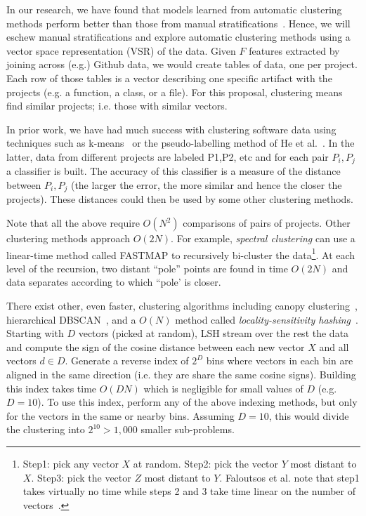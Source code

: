 In our research, we have found that models learned from automatic clustering methods
perform better than those from manual stratifications~\cite{me06a,Menzies2012}.
Hence, we will eschew manual stratifications and explore automatic clustering methods
using a vector space representation (VSR) of the data.
Given $F$ features extracted by joining across (e.g.) Github data, we would create tables of data, one per project. Each row of those tables is a vector describing  one specific artifact with the projects (e.g. a function, a class, or a file). For this proposal, clustering means find similar projects; i.e. those with similar vectors.


In prior work,
we have had much success with
   clustering software data using techniques 
such as k-means~\cite{majumder18} or 
 the pseudo-labelling method of He et al.~\cite{he2013learning}.  In the latter, data from different projects are labeled P1,P2, etc and for each pair $P_i,P_j$ a classifier is built.
The accuracy of this classifier is a measure of the distance between  $P_i,P_j$  (the larger
the error, the more similar and hence the closer the projects).   These distances could then be used by some other clustering methods. 

Note that all the above require $O(N^2)$ comparisons of pairs of projects.
Other clustering methods approach $O(2N)$. For example,
  {\em spectral clustering}  can use a linear-time method called FASTMAP to recursively bi-cluster the data\footnote{Step1: pick any vector $X$ at random.
  Step2: pick the vector $Y$ most distant to $X$. Step3: pick
  the vector $Z$ most distant to $Y$.
  Faloutsos et al. note that step1 takes virtually no time while
  steps 2 and 3 take 
  time linear on the number of vectors~\cite{faloutsos1995fastmap}.}.
  At each level of the recursion, two distant ``pole'' points are found in time $O(2N)$ and data separates according to which ``pole' is closer.
  
There exist other, even faster, clustering algorithms
including canopy clustering~\cite{McCallum:2000}, hierarchical DBSCAN~\cite{campello2015hierarchical}, and a 
  $O(N)$ method called {\em  locality-sensitivity hashing}~\cite{Andoni:2015}.
Starting with  $D$ vectors (picked at random), LSH stream over the rest the data and compute the
sign of the cosine distance between each new vector $X$ and all vectors $d\in D$. Generate a reverse index of $2^D$ bins where vectors in each bin  are aligned in the same direction (i.e. they are share the same cosine signs).  Building this index takes time $O(DN)$ which is negligible  for small values of
$D$ (e.g. $D=10$). To use this index, perform  any of the above indexing methods, but only for the vectors in the same or nearby bins. Assuming $D=10$, this would divide the clustering into $2^{10}> 1,000$ smaller sub-problems. 


